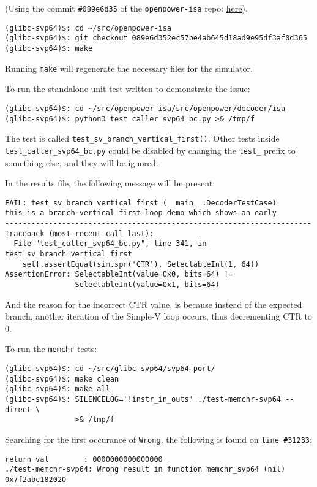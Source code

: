 (Using the commit \texttt{\#089e6d35} of the \texttt{openpower-isa} repo:
\href{https://git.libre-soc.org/?p=openpower-isa.git;a=commitdiff;h=089e6d352ec57be4ab645d18ad9e95df3af0d365}{here}).

\begin{verbatim}
(glibc-svp64)$: cd ~/src/openpower-isa
(glibc-svp64)$: git checkout 089e6d352ec57be4ab645d18ad9e95df3af0d365
(glibc-svp64)$: make
\end{verbatim}

Running \texttt{make} will regenerate the necessary files for the simulator.

To run the standalone unit test written to demonstrate the issue:
\begin{verbatim}
(glibc-svp64)$: cd ~/src/openpower-isa/src/openpower/decoder/isa
(glibc-svp64)$: python3 test_caller_svp64_bc.py >& /tmp/f
\end{verbatim}

The test is called \texttt{test\_sv\_branch\_vertical\_first()}. Other tests inside
\texttt{test\_caller\_svp64\_bc.py} could be disabled by changing the
\texttt{test\_} prefix to something else, and they will be ignored.

In the results file, the following message will be present:
\begin{verbatim}
FAIL: test_sv_branch_vertical_first (__main__.DecoderTestCase)
this is a branch-vertical-first-loop demo which shows an early
----------------------------------------------------------------------
Traceback (most recent call last):
  File "test_caller_svp64_bc.py", line 341, in test_sv_branch_vertical_first
    self.assertEqual(sim.spr('CTR'), SelectableInt(1, 64))
AssertionError: SelectableInt(value=0x0, bits=64) !=
                SelectableInt(value=0x1, bits=64)
\end{verbatim}

And the reason for the incorrect CTR value, is because instead of the expected
branch, another iteration of the Simple-V loop occurs, thus
decrementing CTR to 0.

To run the \texttt{memchr} tests:
\begin{verbatim}
(glibc-svp64)$: cd ~/src/glibc-svp64/svp64-port/
(glibc-svp64)$: make clean
(glibc-svp64)$: make all
(glibc-svp64)$: SILENCELOG='!instr_in_outs' ./test-memchr-svp64 --direct \
                >& /tmp/f
\end{verbatim}


Searching for the first occurance of \texttt{Wrong}, the following is found on
\texttt{line \#31233}:
\begin{verbatim}
return val        : 0000000000000000
./test-memchr-svp64: Wrong result in function memchr_svp64 (nil) 0x7f2abc182020
\end{verbatim}

